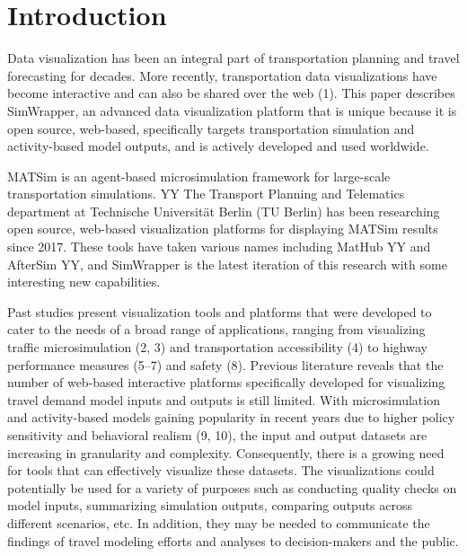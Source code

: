 \documentclass[3p,times,procedia]{elsarticle}
\begin{document}



\section{Introduction}

Data visualization has been an integral part of transportation planning and travel forecasting for decades. More recently, transportation data visualizations have become interactive and can also be shared over the web (1). This paper describes SimWrapper, an advanced data visualization platform that is unique because it is open source, web-based, specifically targets transportation simulation and activity-based model outputs, and is actively developed and used worldwide.

MATSim is an agent-based microsimulation framework for large-scale transportation simulations. YY The Transport Planning and Telematics department at Technische Universität Berlin (TU Berlin) has been researching open source, web-based visualization platforms for displaying MATSim results since 2017.  These tools have taken various names including MatHub YY and AfterSim YY, and SimWrapper is the latest iteration of this research with some interesting new capabilities.

Past studies present visualization tools and platforms that were developed to cater to the needs of a broad range of applications, ranging from visualizing traffic microsimulation (2, 3) and transportation accessibility (4) to highway performance measures (5–7) and safety (8). Previous literature reveals that the number of web-based interactive platforms specifically developed for visualizing travel demand model inputs and outputs is still limited. With microsimulation and activity-based models gaining popularity in recent years due to higher policy sensitivity and behavioral realism (9, 10), the input and output datasets are increasing in granularity and complexity. Consequently, there is a growing need for tools that can effectively visualize these datasets. The visualizations could potentially be used for a variety of purposes such as conducting quality checks on model inputs, summarizing simulation outputs, comparing outputs across different scenarios, etc. In addition, they may be needed to communicate the findings of travel modeling efforts and analyses to decision-makers and the public.
\end{document}
